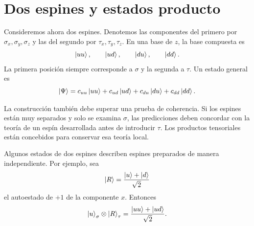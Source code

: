 \begin{classroomqa}
\end{classroomqa}

\section{Dos espines y estados producto}

Consideremos ahora dos espines. Denotemos las componentes del primero por \(\sigma_x,\sigma_y,\sigma_z\) y las del segundo por \(\tau_x,\tau_y,\tau_z\). En una base de \(z\), la base compuesta es
\begin{equation}
\left\lvert uu\right\rangle,\qquad \left\lvert ud\right\rangle,\qquad \left\lvert du\right\rangle,\qquad \left\lvert dd\right\rangle.
\label{eq:l6-two-spin-basis}
\end{equation}
La primera posición siempre corresponde a \(\sigma\) y la segunda a \(\tau\). Un estado general es
\begin{equation}
\left\lvert\Psi\right\rangle
=c_{uu}\left\lvert uu\right\rangle+c_{ud}\left\lvert ud\right\rangle
+c_{du}\left\lvert du\right\rangle+c_{dd}\left\lvert dd\right\rangle.
\label{eq:l6-general-two-spin}
\end{equation}

\begin{classroomqa}
\end{classroomqa}

La construcción también debe superar una prueba de coherencia. Si los espines están muy separados y solo se examina \(\sigma\), las predicciones deben concordar con la teoría de un espín desarrollada antes de introducir \(\tau\). Los productos tensoriales están concebidos para conservar esa teoría local.

Algunos estados de dos espines describen espines preparados de manera independiente. Por ejemplo, sea
\begin{equation}
\left\lvert R\right\rangle=\frac{\left\lvert u\right\rangle+\left\lvert d\right\rangle}{\sqrt2}
\end{equation}
el autoestado de \(+1\) de la componente \(x\). Entonces
\begin{equation}
\left\lvert u\right\rangle_{\sigma}\otimes\left\lvert R\right\rangle_{\tau}
=\frac{\left\lvert uu\right\rangle+\left\lvert ud\right\rangle}{\sqrt2}.
\label{eq:l6-up-right-product}
\end{equation}

